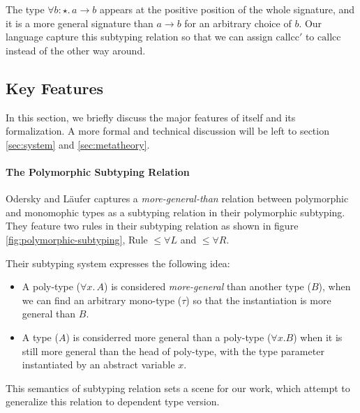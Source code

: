 The type $\forall b : \star.\, a \rightarrow b$ appears at the positive position
of the whole signature, and it is a more general signature than $a \rightarrow b$
for an arbitrary choice of $b$. Our language capture this subtyping relation so that
 we can assign $\mathrm{callcc}'$ to $\mathrm{callcc}$ instead of the other way around.

\subsection{Key Features}

In this section, we briefly discuss the major features of \name itself and
its formalization. A more formal and technical discussion will be left to
section \ref{sec:system} and \ref{sec:metatheory}.

\paragraph{The Polymorphic Subtyping Relation}
Odersky and L\"aufer captures a \emph{more-general-than} relation between
polymorphic and monomophic types as a subtyping relation in their polymorphic
subtyping\cite{odersky1996putting}. They feature two rules in their
subtyping relation as shown in figure \ref{fig:polymorphic-subtyping},
Rule $\le\forall L$ and $\le\forall R$.

Their subtyping system expresses the following idea:

\begin{itemize}
  \item A poly-type ($\forall x.\, A$) is considered \emph{more-general}
        than another type ($B$), when we can find an arbitrary mono-type ($\tau$)
        so that the instantiation is more general than $B$.
  \item A type ($A$) is considerred more general than a poly-type ($\forall x. B$)
        when it is still more general than the head of poly-type, with the type
        parameter instantiated by an abstract variable $x$.
\end{itemize}

This semantics of subtyping relation sets a scene for our work, which attempt
to generalize this relation to dependent type version.

